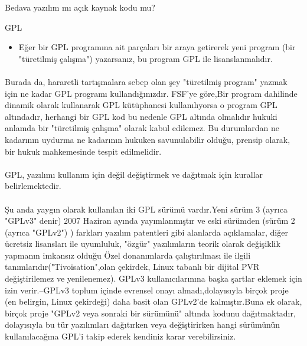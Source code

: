 \documentclass[10pt,a5paper]{book}
\begin{document}
\begin{section}{Bedava yazılım mı açık kaynak kodu mu?}
\begin{subsection}{GPL}
\begin{itemize}
 \paragraph{}{Eğer biri para ile GPL yazılım satın alırsa, doğal olarak sadece bütün bilgisayarlarında çalıştırma hakkına sahiptir, kopyalayamaz ve yeniden satamaz.(GPL lisansı altında).Bunun bir sonucu olarak da "koltuk başına" GPL yazılım satmak  mantıklı bir iş değildir, bu durumun önemli bir sonucu olarakta fiyatlar açısından rahatlık sağlamasıdır bu sebeple Linux dağıtımları kullanmak mantıklıdır.}
 \item Eğer bir GPL programına ait parçaları bir araya getirerek yeni program (bir "türetilmiş çalışma") yazarsanız, bu program GPL ile lisanslanmalıdır.
\end{itemize}
\paragraph{}{Burada da, hararetli tartışmalara sebep olan şey "türetilmiş program" yazmak için ne kadar GPL programı kullandığınızdır. FSF'ye göre,Bir program dahilinde dinamik olarak kullanarak GPL kütüphanesi kullanılıyorsa o program GPL altındadır, herhangi bir GPL kod  bu nedenle GPL altında olmalıdır hukuki anlamda bir "türetilmiş çalışma" olarak kabul edilemez. Bu durumlardan ne kadarının uydurma ne kadarının hukuken savunulabilir olduğu, prensip olarak, bir hukuk mahkemesinde tespit edilmelidir.}
\paragraph{}{GPL, yazılımı kullanım için değil değiştirmek ve dağıtmak için kurallar belirlemektedir.}
\paragraph{}{Şu anda  yaygın olarak kullanılan  iki GPL sürümü vardır.Yeni sürüm 3 (ayrıca "GPLv3" denir)  2007 Haziran ayında yayımlanmıştır ve eski sürümden (sürüm 2 (ayrıca "GPLv2") ) farkları yazılım patentleri gibi alanlarda açıklamalar, diğer ücretsiz lisansları ile uyumluluk, "özgür" yazılımların teorik olarak değişiklik yapmanın imkansız olduğu Özel donanımlarda çalıştırılması ile ilgili tanımlarıdır("Tivoisation",olan çekirdek, Linux tabanlı bir dijital PVR değiştirilemez ve yenilenemez). GPLv3 kullanıcılarınına başka şartlar eklemek için izin verir.--GPLv3 toplum içinde evrensel onayı almadı,dolayısıyla birçok proje (en belirgin, Linux çekirdeği) daha basit  olan GPLv2'de kalmıştır.Buna ek olarak, birçok proje "GPLv2 veya sonraki bir sürümünü" altında kodunu dağıtmaktadır, dolayısıyla bu tür yazılımları dağıtırken veya değiştirirken hangi sürümünün kullanılacağına GPL'i takip ederek kendiniz karar verebilirsiniz.}

\end{subsection}
\end{section}
\end{document}
